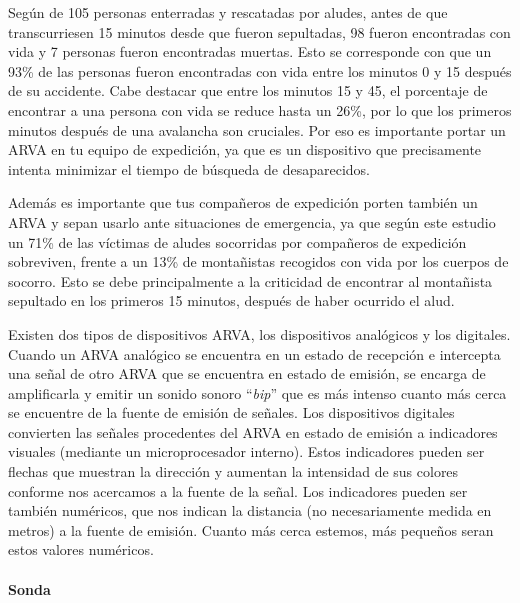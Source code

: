 
Según \cite{41} de 105 personas enterradas y rescatadas por aludes, antes de que transcurriesen 15 minutos desde que fueron sepultadas, 98 fueron encontradas con vida y 7 personas fueron encontradas muertas. Esto se corresponde con que un 93\% de las personas fueron encontradas con vida entre los minutos 0 y 15 después de su accidente. Cabe destacar que entre los minutos 15 y 45, el porcentaje de encontrar a una persona con vida se reduce hasta un 26\%, por lo que los primeros minutos después de una avalancha son cruciales. Por eso es importante portar un \ac{ARVA} en tu equipo de expedición, ya que es un dispositivo que precisamente intenta minimizar el tiempo de búsqueda de desaparecidos. 

Además es importante que tus compañeros de expedición porten también un \ac{ARVA} y sepan usarlo ante situaciones de emergencia, ya que según este estudio un 71\% de las víctimas de aludes socorridas por compañeros de expedición sobreviven, frente a un 13\% de montañistas recogidos con vida por los cuerpos de socorro. Esto se debe principalmente a la criticidad de encontrar al montañista sepultado en los primeros 15 minutos, después de haber ocurrido el alud. 

Existen dos tipos de dispositivos \ac{ARVA}, los dispositivos analógicos y los digitales. Cuando un \ac{ARVA} analógico se encuentra en un estado de recepción e intercepta una señal de otro \ac{ARVA} que se encuentra en estado de emisión, se encarga de amplificarla y emitir un sonido sonoro ``\textit{bip}'' que es más intenso cuanto más cerca se encuentre de la fuente de emisión de señales. Los dispositivos digitales convierten las señales procedentes del \ac{ARVA} en estado de emisión a indicadores visuales (mediante un microprocesador interno). Estos indicadores pueden ser flechas que muestran la dirección y aumentan la intensidad de sus colores conforme nos acercamos a la fuente de la señal. Los indicadores pueden ser también numéricos, que nos indican la distancia (no necesariamente medida en metros) a la fuente de emisión. Cuanto más cerca estemos, más pequeños seran estos valores numéricos. 

\paragraph{Sonda}

